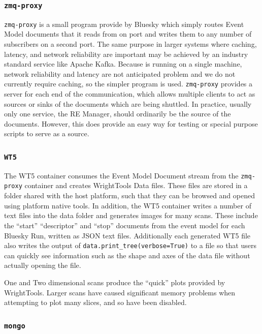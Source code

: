 \subsubsection{\texttt{zmq-proxy}}

\texttt{zmq-proxy} is a small program provide by Bluesky which simply routes Event Model documents that it reads from on port and writes them to any number of subscribers on a second port.
The same purpose in larger systems where caching, latency, and network reliability are important may be achieved by an industry standard service like Apache Kafka\cite{kafka}.
Because \biab is running on a single machine, network reliability and latency are not anticipated problem and we do not currently require caching, so the simpler program is used.
\texttt{zmq-proxy} provides a server for each end of the communication, which allows multiple clients to act as sources or sinks of the documents which are being shuttled.
In practice, usually only one service, the RE Manager, should ordinarily be the source of the documents.
However, this does provide an easy way for testing or special purpose scripts to serve as a source.

\subsubsection{\texttt{WT5}}

The WT5 container consumes the Event Model Document stream from the \texttt{zmq-proxy} container and creates WrightTools Data files.
These files are stored in a folder shared with the host platform, such that they can be browsed and opened using platform native tools.
In addition, the WT5 container writes a number of text files into the data folder and generates images for many scans.
These include the ``start'' ``descriptor'' and ``stop'' documents from the event model for each Bluesky Run, written as JSON text files.
Additionally each generated WT5 file also writes the output of \texttt{data.print\_tree(verbose=True)} to a file so that users can quickly see information such as the shape and axes of the data file without actually opening the file.

One and Two dimensional scans produce the ``quick'' plots provided by WrightTools.
Larger scans have caused significant memory problems when attempting to plot many slices, and so have been disabled.

\subsubsection{\texttt{mongo}}

